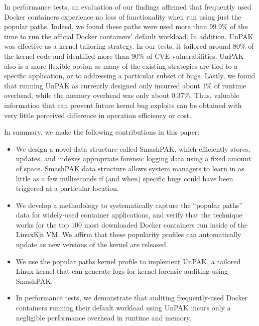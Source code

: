 In performance tests, an evaluation of our findings affirmed that frequently used Docker containers experience no loss of functionality when run using just the popular paths. 
Indeed, we found these paths were used more than 99.9\% of the time to run the official Docker containers’ default workload. In addition, 
UnPAK was effective as a kernel tailoring strategy. In our tests, it tailored around 80\% of the kernel code and identified more than 90\% of CVE vulnerabilities. 
UnPAK also is a more flexible option as many of the existing strategies are tied to a specific application, or to addressing a particular subset of bugs. 
Lastly, we found that running UnPAK as currently designed only incurred about 1\% of runtime overhead, while the memory overhead was only about 0.37\%. 
Thus, valuable information that can prevent future kernel bug exploits can be obtained with very little perceived difference in operation efficiency or cost.

In summary, we make the following contributions in this paper:
\begin{itemize}
	\item We design a novel data structure called SmashPAK, which efficiently stores, updates, and indexes appropriate forensic logging data using a fixed amount of space. SmashPAK data structure allows system managers to learn in as little as a few milliseconds if (and when) specific bugs could have been triggered at a particular location.
	\item We develop a methodology to systematically capture the “popular paths” data for widely-used container applications, and verify that the technique works for the top 100 most downloaded Docker containers run inside of the LinuxKit VM.  We affirm that these popularity profiles can automatically update as new versions of the kernel are released.
	\item We use the popular paths kernel profile to implement UnPAK, a  tailored  Linux kernel that can generate logs for kernel forensic auditing using SmashPAK. 
	\item In performance tests, we demonstrate that auditing frequently-used Docker containers running their default workload using UnPAK incurs only a negligible performance overhead in runtime and memory. 
\end{itemize}